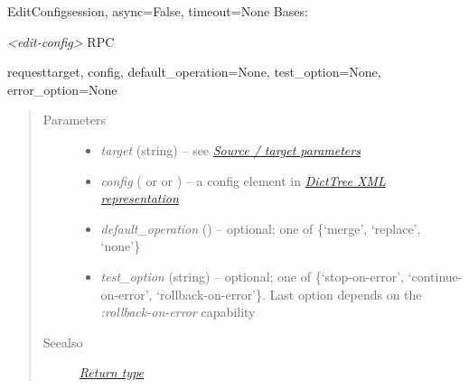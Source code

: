 \documentclass[a4paper,10pt,english]{manual}
\begin{document}
\hypertarget{ncclient.operations.EditConfig}{}\begin{classdesc}{EditConfig}{session, async=False, timeout=None}
Bases: \hyperlink{ncclient.operations.rpc.RPC}{}

\emph{\textless{}edit-config\textgreater{}} RPC

\hypertarget{ncclient.operations.EditConfig.request}{}\begin{methoddesc}{request}{target, config, default\_operation=None, test\_option=None, error\_option=None}~\begin{quote}\begin{description}
\item[Parameters]\begin{itemize}
\item {} 
\emph{target} (string) -- see \hyperlink{source-target}{\emph{Source / target parameters}}

\item {} 
\emph{config} (\href{http://docs.python.org/library/string.html\#string}{} or \href{http://docs.python.org/library/stdtypes.html\#dict}{} or \href{http://docs.python.org/library/xml.etree.elementtree.html\#xml.etree.ElementTree.Element}{}) -- a config element in \hyperlink{dtree}{\emph{DictTree XML representation}}

\item {} 
\emph{default\_operation} (\href{http://docs.python.org/library/string.html\#string}{}) -- optional; one of \{`merge', `replace', `none'\}

\item {} 
\emph{test\_option} (string) -- optional; one of \{`stop-on-error', `continue-on-error', `rollback-on-error'\}. Last option depends on the \emph{:rollback-on-error} capability

\end{itemize}

\item[Seealso]
\hyperlink{return}{\emph{Return type}}

\end{description}\end{quote}
\end{methoddesc}
\end{classdesc}
\end{document}
